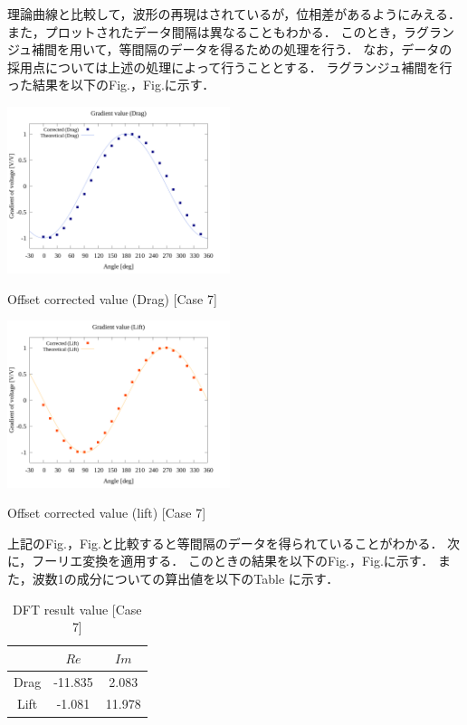 理論曲線と比較して，波形の再現はされているが，位相差があるようにみえる．
また，プロットされたデータ間隔は異なることもわかる．
このとき，ラグランジュ補間を用いて，等間隔のデータを得るための処理を行う．
なお，データの採用点については上述の処理によって行うこととする．
ラグランジュ補間を行った結果を以下のFig.，Fig.に示す．

\begin{multicols}{2}
    \begin{figure_here}
        \begin{center}
        \includegraphics[width=65mm]{../../02_workspace/result/simulation_tx=10.0_ty=-5.0_dx=5.00_dy=-2.50/plot/21/21-3_interpolated_drag.png}
        \caption{Offset corrected value (Drag) [Case 7]}
        \includegraphics[width=65mm]{../../02_workspace/result/simulation_tx=10.0_ty=-5.0_dx=5.00_dy=-2.50/plot/21/21-3_interpolated_lift.png}
        \caption{Offset corrected value (lift) [Case 7]}
        \end{center}
    \end{figure_here}
\end{multicols}

上記のFig.，Fig.と比較すると等間隔のデータを得られていることがわかる．
次に，フーリエ変換を適用する．
このときの結果を以下のFig.，Fig.に示す．
また，波数1の成分についての算出値を以下のTable に示す．

\begin{table}[htbp]
    \begin{center}
        \caption{DFT result value [Case 7]}
        \begin{tabular}{|p{30mm}|p{20mm}|p{20mm}|}
            \hline
            \multicolumn{1}{|c|}{}       & \multicolumn{1}{|c|}{$Re$}   & \multicolumn{1}{|c|}{$Im$} \\ \hline
            \multicolumn{1}{|c|}{Drag} & \multicolumn{1}{|c|}{-11.835}     & \multicolumn{1}{|c|}{2.083}         \\ \hline
            \multicolumn{1}{|c|}{Lift} & \multicolumn{1}{|c|}{-1.081}     & \multicolumn{1}{|c|}{11.978}         \\ \hline
        \end{tabular}
    \end{center}
\end{table}

